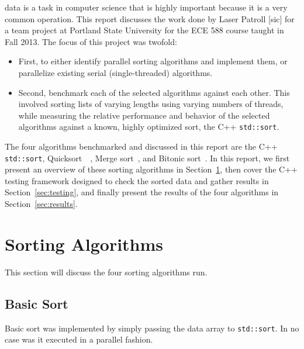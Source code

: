 \documentclass[journal]{IEEEtran}
\begin{document}
 data is a task in computer science that is highly important because it is a very common operation. This report discusses the work done by Laser Patroll [sic] for a team project at Portland State University for the ECE 588 course taught in Fall 2013. The focus of this project was twofold: 
\begin{itemize}
\item First, to either identify parallel sorting algorithms and implement them, or parallelize existing serial (single-threaded) algorithms. 
\item Second, benchmark each of the selected algorithms against each other.  This involved sorting lists of varying lengths using varying numbers of threads, while measuring the relative performance and behavior of the selected algorithms against a known, highly optimized sort, the C++ \texttt{std::sort}.
\end{itemize}


The four algorithms benchmarked and discussed in this report are the C++ \texttt{std::sort}, Quicksort~\cite{Hoare1961}~\cite{Hoare1962}, Merge sort~\cite{Knuth:1998:ACP:280635}, and Bitonic sort~\cite{Batcher1968}. In this report, we first present an overview of these sorting algorithms in Section~\ref{sec:sorting}, then cover the C++ testing framework designed to check the sorted data and gather results in Section~\ref{sec:testing}, and finally present the results of the four algorithms in Section~\ref{sec:results}.



\section{Sorting Algorithms}
\label{sec:sorting}
This section will discuss the four sorting algorithms run.

\subsection{Basic Sort}
Basic sort was implemented by simply passing the data array to \texttt{std::sort}. In no case was it executed in a parallel fashion.
\end{document}
